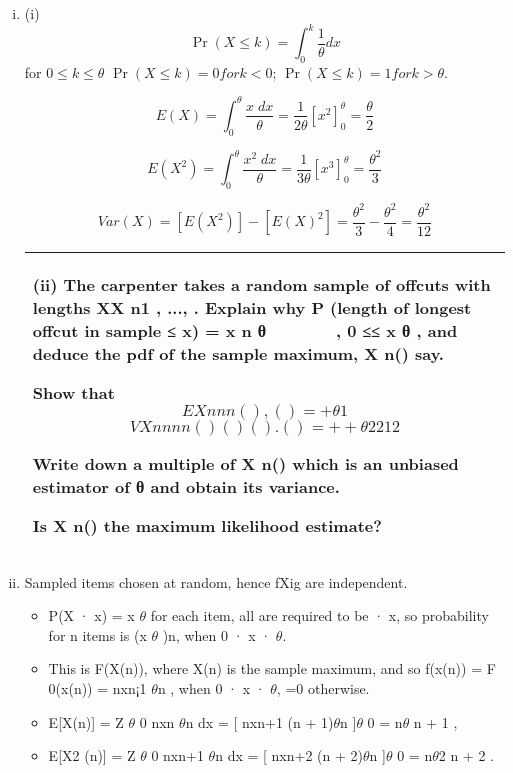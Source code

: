 \documentclass[a4paper,12pt]{article}
\begin{document}
\begin{enumerate}[(i)]
\item (i) \[ \Pr(X \leq k) = \int^{k}_{0} \frac{1}{\theta} dx\] for $0\leq k \leq \theta$
$ \Pr(X \leq k) = 0 for k < 0$; $\Pr(X \leq k) = 1 for k > \theta$.

\[E(X) = \int^{\theta}_{0} \frac{x\;dx}{\theta} = \frac{1}{2\theta}\left[ x^2 \right]^{\theta}_{0} = \frac{\theta}{2}\]



\[E(X^2) = \int^{\theta}_{0} \frac{x^2\;dx}{\theta} = \frac{1}{3\theta}\left[ x^3 \right]^{\theta}_{0} = \frac{\theta^2}{3}\]

\[ Var(X) = [E(X^2)] - [E(X)^2] = \frac{\theta^2}{3} - \frac{\theta^2}{4} = \frac{\theta^2}{12}\]
\newpage
 \begin{table}[ht!]
 \centering
 \begin{tabular}{|p{15cm}|}
 \hline  
(ii) The carpenter takes a random sample of offcuts with lengths XX n1 , ..., . Explain why
P (length of longest offcut in sample ≤ x) = 
x n θ
  
   ,  0 ≤≤ x θ ,
and deduce the pdf of the sample maximum, X n() say.


Show that
\[EX
n nn ( ) , () = + θ 1\]
\[VX
n
nn
n ()
( ) ( ) .() = ++ θ 2 2 12
\]

Write down a multiple of  X n() which is an unbiased estimator of 
θ
 and obtain its
variance.


Is  X n() the maximum likelihood estimate? \\ \hline 
  \end{tabular}
\end{table}
\item Sampled items chosen at random, hence fXig are independent. 
\begin{itemize}
\item P(X · x) =
x
$\theta$ for each item, all are required to be · x, so probability for n items is (x
$\theta$ )n,
when 0 · x · $\theta$. 
\item This is F(X(n)), where X(n) is the sample maximum, and
so f(x(n)) = F
0(x(n)) = nxn¡1
$\theta$n , when 0 · x · $\theta$, =0 otherwise.
\item E[X(n)] =
Z $\theta$
0
nxn
$\theta$n dx = [ nxn+1
(n + 1)$\theta$n ]$\theta$
0 = n$\theta$
n + 1
,
\item E[X2
(n)] =
Z $\theta$
0
nxn+1
$\theta$n dx = [ nxn+2
(n + 2)$\theta$n ]$\theta$
0 = n$\theta$2
n + 2
.


\end{itemize}
\end{enumerate}
\end{document}
